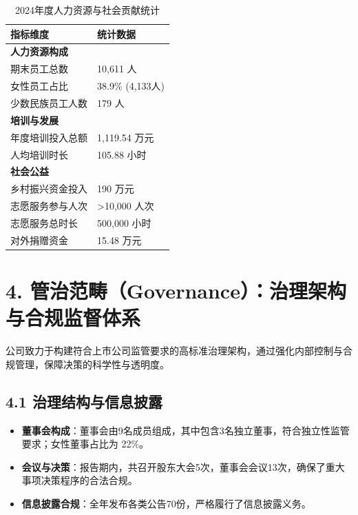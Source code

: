 \documentclass[a4paper,12pt]{article}
\begin{document}
\begin{table}[H]
    \centering
    \caption{2024年度人力资源与社会贡献统计}
    \label{tab:social_stats}
    \renewcommand{\arraystretch}{1.3}
    \begin{tabular}{p{7cm} p{6cm}}
        \toprule
        \textbf{指标维度} & \textbf{统计数据} \\
        \midrule
        \textbf{人力资源构成} & \\
        期末员工总数 & 10,611 人 \\
        女性员工占比 & 38.9\% (4,133人) \\
        少数民族员工人数 & 179 人 \\
        \midrule
        \textbf{培训与发展} & \\
        年度培训投入总额 & 1,119.54 万元 \\
        人均培训时长 & 105.88 小时 \\
        \midrule
        \textbf{社会公益} & \\
        乡村振兴资金投入 & 190 万元 \\
        志愿服务参与人次 & >10,000 人次 \\
        志愿服务总时长 & 500,000 小时 \\
        对外捐赠资金 & 15.48 万元 \\
        \bottomrule
    \end{tabular}
\end{table}

\section{4. 管治范畴（Governance）：治理架构与合规监督体系}

公司致力于构建符合上市公司监管要求的高标准治理架构，通过强化内部控制与合规管理，保障决策的科学性与透明度。

\subsection{4.1 治理结构与信息披露}

\begin{itemize}
    \item \textbf{董事会构成}：董事会由9名成员组成，其中包含3名独立董事，符合独立性监管要求；女性董事占比为 22\%。
    \item \textbf{会议与决策}：报告期内，共召开股东大会5次，董事会会议13次，确保了重大事项决策程序的合法合规。
    \item \textbf{信息披露合规}：全年发布各类公告70份，严格履行了信息披露义务。
\end{itemize}
\end{document}
